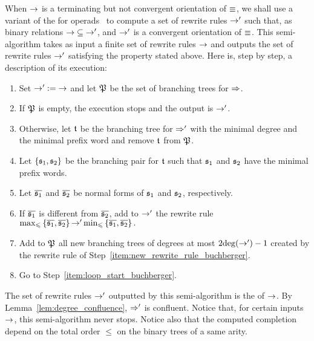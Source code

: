 When $\operatorname{\to}$ is a terminating but not convergent orientation of $\operatorname{\equiv}$,
we shall use a variant of the  for
operads~\cite[Section 3.7]{DK10} to compute a set of rewrite rules
$\operatorname{\to}'$ such that, as binary relations $\operatorname{\to} \subseteq \operatorname{\to}'$, and
$\operatorname{\to}'$ is a convergent orientation of $\operatorname{\equiv}$. This semi-algorithm
takes as input a finite set of rewrite rules $\operatorname{\to}$ and outputs the set
of rewrite rules $\operatorname{\to}'$ satisfying the property stated above. Here is,
step by step, a description of its execution:
\begin{enumerate}[label={(\it\arabic*)}]
  \item Set $\operatorname{\to}' := \operatorname{\to}$ and let $\mathfrak{P}$ be the set of
    branching trees for $\operatorname{\Rightarrow}$.
  \item \label{item:loop_start_buchberger}
    If $\mathfrak{P}$ is empty, the execution stops and the output
    is $\operatorname{\to}'$.
  \item Otherwise, let $\mathfrak{t}$ be the branching tree for $\operatorname{\Rightarrow}'$
    with the minimal degree and the minimal prefix word and remove $\mathfrak{t}$
    from $\mathfrak{P}$.
  \item Let $\{\mathfrak{s}_1, \mathfrak{s}_2\}$ be the branching pair for $\mathfrak{t}$ such
    that $\mathfrak{s}_1$ and $\mathfrak{s}_2$ have the minimal prefix words.
  \item Let $\overline{\mathfrak{s}_1}$ and $\overline{\mathfrak{s}_2}$ be normal forms of
    $\mathfrak{s}_1$ and $\mathfrak{s}_2$, respectively.
  \item \label{item:new_rewrite_rule_buchberger}
    If $\overline{\mathfrak{s}_1}$ is different from $\overline{\mathfrak{s}_2}$, add
    to $\operatorname{\to}'$ the rewrite rule
    \begin{math}
      \max_\leqslant \left\{\overline{\mathfrak{s}_1}, \overline{\mathfrak{s}_2}\right\}
      \operatorname{\to}'
      \min_\leqslant \left\{\overline{\mathfrak{s}_1}, \overline{\mathfrak{s}_2}\right\}.
    \end{math}
  \item Add to $\mathfrak{P}$ all new branching trees of degrees at
    most $2 \mathrm{deg}(\operatorname{\to}') - 1$ created by the rewrite rule of
    Step~\ref{item:new_rewrite_rule_buchberger}.
  \item Go to Step~\ref{item:loop_start_buchberger}.
\end{enumerate}
The set of rewrite rules $\operatorname{\to}'$ outputted by this semi-algorithm is the
 of $\operatorname{\to}$. By Lemma~\ref{lem:degree_confluence},
$\operatorname{\Rightarrow}'$ is confluent. Notice that, for certain inputs $\operatorname{\to}$,
this semi-algorithm never stops. Notice also that the computed
completion depend on the total order $\leq$ on the binary trees of a
same arity.
\medbreak
